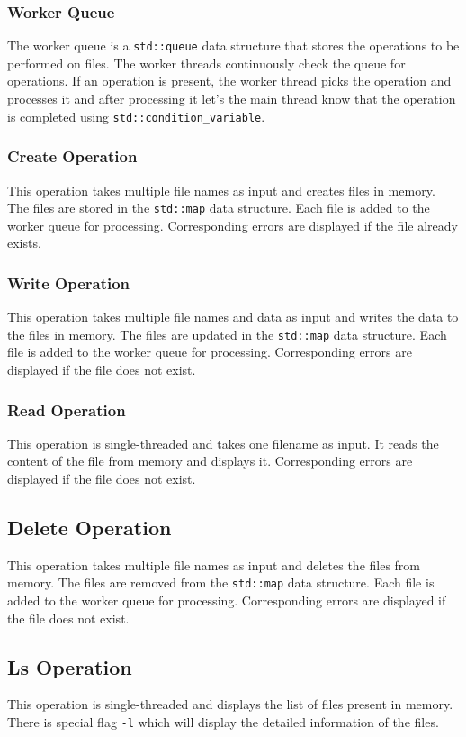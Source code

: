 \documentclass{article}
\begin{document}
\subsubsection{Worker Queue}
The worker queue is a \texttt{std::queue} data structure that stores the operations to be performed on files. The worker threads continuously check the queue for operations. If an operation is present, the worker thread picks the operation and processes it and after processing it let's the main thread know that the operation is completed using \texttt{std::condition\_variable}.

\subsubsection{Create Operation}
\noindent This operation takes multiple file names as input and creates files in memory. The files are stored in the \texttt{std::map} data structure. Each file is added to the worker queue for processing. Corresponding errors are displayed if the file already exists.

\subsubsection{Write Operation}
\noindent This operation takes multiple file names and data as input and writes the data to the files in memory. The files are updated in the \texttt{std::map} data structure. Each file is added to the worker queue for processing. Corresponding errors are displayed if the file does not exist.

\subsubsection{Read Operation}
\noindent This operation is single-threaded and takes one filename as input. It reads the content of the file from memory and displays it. Corresponding errors are displayed if the file does not exist.

\subsection{Delete Operation}
\noindent This operation takes multiple file names as input and deletes the files from memory. The files are removed from the \texttt{std::map} data structure. Each file is added to the worker queue for processing. Corresponding errors are displayed if the file does not exist.

\subsection{Ls Operation}
\noindent This operation is single-threaded and displays the list of files present in memory. There is special flag \texttt{-l} which will display the detailed information of the files.
\end{document}
